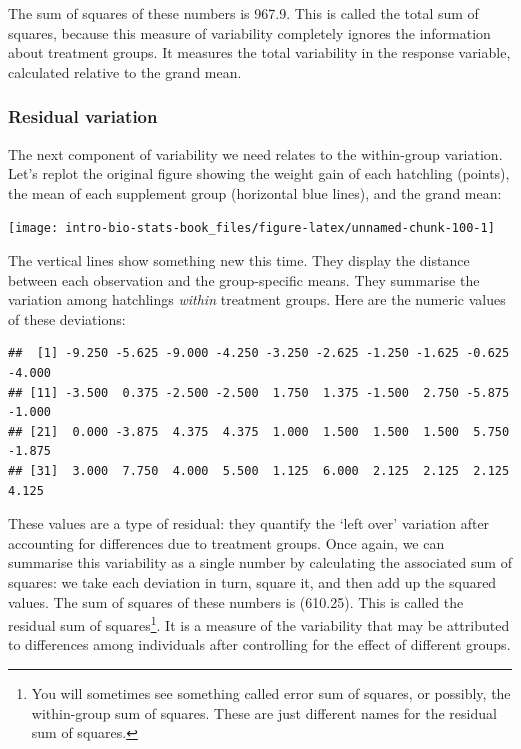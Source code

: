 \documentclass[
]{book}
\begin{document}
The sum of squares of these numbers is 967.9. This is called the total sum of squares, because this measure of variability completely ignores the information about treatment groups. It measures the total variability in the response variable, calculated relative to the grand mean.

\hypertarget{residual-variation-1}{%
\subsubsection*{Residual variation}\label{residual-variation-1}}

The next component of variability we need relates to the within-group variation. Let's replot the original figure showing the weight gain of each hatchling (points), the mean of each supplement group (horizontal blue lines), and the grand mean:

\begin{center}\texttt{[image: intro-bio-stats-book\_files/figure-latex/unnamed-chunk-100-1]} \end{center}

The vertical lines show something new this time. They display the distance between each observation and the group-specific means. They summarise the variation among hatchlings \emph{within} treatment groups. Here are the numeric values of these deviations:

\begin{verbatim}
##  [1] -9.250 -5.625 -9.000 -4.250 -3.250 -2.625 -1.250 -1.625 -0.625 -4.000
## [11] -3.500  0.375 -2.500 -2.500  1.750  1.375 -1.500  2.750 -5.875 -1.000
## [21]  0.000 -3.875  4.375  4.375  1.000  1.500  1.500  1.500  5.750 -1.875
## [31]  3.000  7.750  4.000  5.500  1.125  6.000  2.125  2.125  2.125  4.125
\end{verbatim}

These values are a type of residual: they quantify the `left over' variation after accounting for differences due to treatment groups. Once again, we can summarise this variability as a single number by calculating the associated sum of squares: we take each deviation in turn, square it, and then add up the squared values. The sum of squares of these numbers is (610.25). This is called the residual sum of squares\footnote{You will sometimes see something called error sum of squares, or possibly, the within-group sum of squares. These are just different names for the residual sum of squares.}. It is a measure of the variability that may be attributed to differences among individuals after controlling for the effect of different groups.
\end{document}

